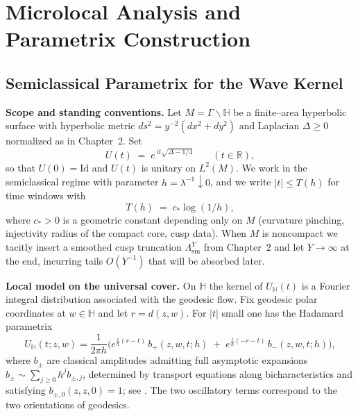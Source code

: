 
\section{Microlocal Analysis and Parametrix Construction}\label{sec:microlocal}

\subsection{Semiclassical Parametrix for the Wave Kernel}\label{subsec:wave-parametrix}

\noindent\textbf{Scope and standing conventions.}
Let $M=\Gamma\backslash\mathbb{H}$ be a finite–area hyperbolic surface with hyperbolic metric
$ds^{2}=y^{-2}(dx^{2}+dy^{2})$ and Laplacian $\Delta\ge 0$ normalized as in Chapter~2.
Set
\[
U(t)\;=\;e^{\,it\sqrt{\Delta-1/4}}\qquad(t\in\mathbb{R}),
\]
so that $U(0)=\mathrm{Id}$ and $U(t)$ is unitary on $L^{2}(M)$.
We work in the semiclassical regime with parameter $h=\lambda^{-1}\downarrow 0$,
and we write $|t|\le T(h)$ for time windows with
\[
T(h)\;=\;c_{*}\log(1/h),
\]
where $c_{*}>0$ is a geometric constant depending only on $M$
(curvature pinching, injectivity radius of the compact core, cusp data).
When $M$ is noncompact we tacitly insert a smoothed cusp truncation
$\Lambda^{Y}_{\mathrm{sm}}$ from Chapter~2 and let $Y\to\infty$ at the end,
incurring tails $O(Y^{-1})$ that will be absorbed later.

\medskip

\noindent\textbf{Local model on the universal cover.}
On $\mathbb{H}$ the kernel of $U_{\mathbb{H}}(t)$ is a Fourier integral distribution associated
with the geodesic flow.
Fix geodesic polar coordinates at $w\in\mathbb{H}$ and let $r=d(z,w)$.
For $|t|$ small one has the Hadamard parametrix
\begin{equation}\label{eq:hadamard-small-time}
U_{\mathbb{H}}(t;z,w)
=\frac{1}{2\pi h}\Big(e^{\frac{i}{h}(r-t)}\,b_{+}(z,w,t;h)\;+\;e^{\frac{i}{h}(-r-t)}\,b_{-}(z,w,t;h)\Big),
\end{equation}
where $b_{\pm}$ are classical amplitudes admitting full asymptotic expansions
$b_{\pm}\sim\sum_{j\ge 0}h^{j}b_{\pm,j}$, determined by transport equations along
bicharacteristics and satisfying $b_{\pm,0}(z,z,0)=1$; see \cite{Hormander1994,DG1975}.
The two oscillatory terms correspond to the two orientations of geodesics.

